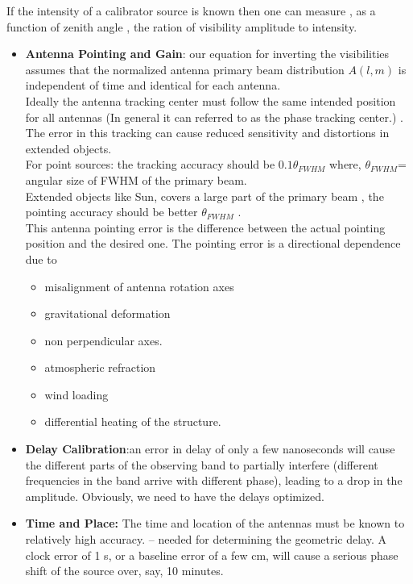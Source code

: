 \documentclass[10pt]{report}
\begin{document}
If the intensity of a calibrator source is known then one can measure , as a function of zenith angle , the ration of visibility amplitude to intensity.\\





\begin{itemize}
\item \textbf{Antenna Pointing and Gain}: our equation for inverting the visibilities assumes that the normalized antenna primary beam distribution $A(l,m)$ is independent of time and identical for each antenna. \\
Ideally the antenna tracking center must follow the same intended position for all antennas (In general it can referred to as the phase tracking center.) . The error in this tracking can cause reduced sensitivity and distortions in extended objects.\\

For point sources: the tracking accuracy should be $0.1\theta_{FWHM}$ where, $\theta_{FWHM}$= angular size of FWHM of the primary beam.\\
Extended objects like Sun, covers a large part of the primary beam , the pointing accuracy should be better $\theta_{FWHM}$ .\\

This antenna pointing error is the difference between the actual pointing position and the desired one. The pointing error is a directional dependence due to
\begin{itemize}
\item misalignment of antenna rotation axes
\item gravitational deformation
\item non perpendicular axes.
\item atmospheric refraction
\item wind loading
\item differential heating of the structure.
\end{itemize}

\item \textbf{Delay Calibration}:an error in delay of only a few nanoseconds will cause the different parts of the observing band to partially interfere (different frequencies in the band arrive with different phase), leading to a drop in the amplitude.  Obviously, we need to have the delays optimized.

\item \textbf{Time and Place:} The time and location of the antennas must be known to relatively high accuracy. -- needed for determining the geometric delay.  A clock error of 1 s, or a baseline error of a few cm, will cause a serious phase shift of the source over, say, 10 minutes. 
\end{itemize}
\end{document}

